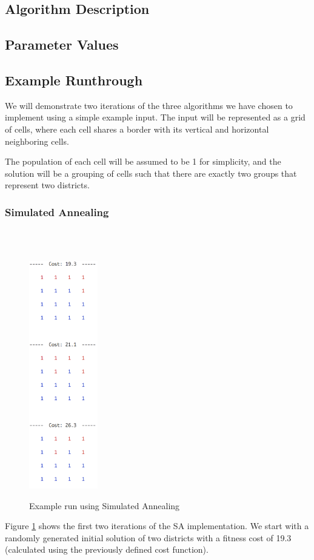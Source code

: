 \documentclass[journal]{IEEEtran}
\begin{document}
\subsection{Algorithm Description}
\subsection{Parameter Values}
\subsection{Example Runthrough}
We will demonstrate two iterations of the three algorithms we have chosen to implement using a simple example input.
The input will be represented as a grid of cells, where each cell shares a border with its vertical and horizontal neighboring cells. 

The population of each cell will be assumed to be 1 for simplicity, and the solution will be a grouping of cells such that there are exactly two groups that represent two districts. \\

\subsubsection{Simulated Annealing}~\\\\
\begin{figure}[h!]
    \includegraphics[width=3cm]{sa.png}
    \centering
    \label{fig:sa_example}
    \caption{Example run using Simulated Annealing}
\end{figure}
Figure \ref{fig:sa_example} shows the first two iterations of the SA implementation.
We start with a randomly generated initial solution of two districts with a fitness cost of 19.3 (calculated using the previously defined cost function).
\end{document}
